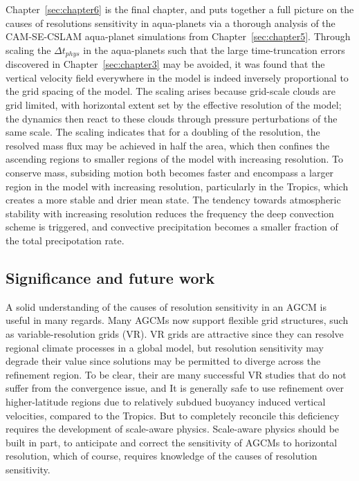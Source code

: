 Chapter~\ref{sec:chapter6} is the final chapter, and puts together a full picture on the causes of resolutions sensitivity in aqua-planets via a thorough analysis of the CAM-SE-CSLAM aqua-planet simulations from Chapter~\ref{sec:chapter5}. Through scaling the $\Delta t_{phys}$ in the aqua-planets such that the large time-truncation errors discovered in Chapter~\ref{sec:chapter3} may be avoided, it was found that the vertical velocity field everywhere in the model is indeed inversely proportional to the grid spacing of the model. The scaling arises because grid-scale clouds are grid limited, with horizontal extent set by the effective resolution of the model; the dynamics then react to these clouds through pressure perturbations of the same scale. The scaling indicates that for a doubling of the resolution, the resolved mass flux may be achieved in half the area, which then confines the ascending regions to smaller regions of the model with increasing resolution. To conserve mass, subsiding motion both becomes faster and encompass a larger region in the model with increasing resolution, particularly in the Tropics, which creates a more stable and drier mean state. The tendency towards atmospheric stability with increasing resolution reduces the frequency the deep convection scheme is triggered, and convective precipitation becomes a smaller fraction of the total precipotation rate.

\subsection{Significance and future work}

A solid understanding of the causes of resolution sensitivity in an AGCM is useful in many regards. Many AGCMs now support flexible grid structures, such as variable-resolution grids (VR). VR grids are attractive since they can resolve regional climate processes in a global model, but resolution sensitivity may degrade their value since solutions may be permitted to diverge across the refinement region. To be clear, their are many successful VR studies that do not suffer from the convergence issue, and It is generally safe to use refinement over higher-latitude regions due to relatively subdued buoyancy induced vertical velocities, compared to the Tropics. But to completely reconcile this deficiency requires the development of scale-aware physics. Scale-aware physics should be built in part, to anticipate and correct the sensitivity of AGCMs to horizontal resolution, which of course, requires knowledge of the causes of resolution sensitivity.

